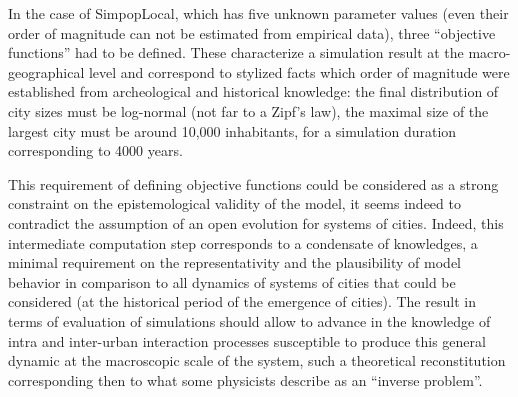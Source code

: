 \documentclass[10pt]{article}
\begin{document}
In the case of SimpopLocal, which has five unknown parameter values (even their order of magnitude can not be estimated from empirical data), three ``objective functions'' had to be defined. These characterize a simulation result at the macro-geographical level and correspond to stylized facts which order of magnitude were established from archeological and historical knowledge: the final distribution of city sizes must be log-normal (not far to a Zipf's law), the maximal size of the largest city must be around 10,000 inhabitants, for a simulation duration corresponding to 4000 years.



This requirement of defining objective functions could be considered as a strong constraint on the epistemological validity of the model, it seems indeed to contradict the assumption of an open evolution for systems of cities. Indeed, this intermediate computation step corresponds to a condensate of knowledges, a minimal requirement on the representativity and the plausibility of model behavior in comparison to all dynamics of systems of cities that could be considered (at the historical period of the emergence of cities). The result in terms of evaluation of simulations should allow to advance in the knowledge of intra and inter-urban interaction processes susceptible to produce this general dynamic at the macroscopic scale of the system, such a theoretical reconstitution corresponding then to what some physicists describe as an ``inverse problem''.
\end{document}

